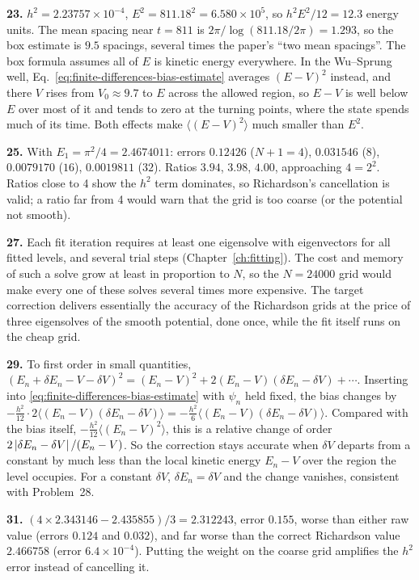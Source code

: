 \textbf{23.} $h^2=2.23757\times10^{-4}$, $E^2=811.18^2=6.580\times10^5$, so $h^2E^2/12=12.3$ energy units. The mean spacing near $t=811$ is $2\pi/\log(811.18/2\pi)=1.293$, so the box estimate is $9.5$ spacings, several times the paper's ``two mean spacings''. The box formula assumes all of $E$ is kinetic energy everywhere. In the Wu--Sprung well, Eq.~\eqref{eq:finite-differences-bias-estimate} averages $(E-V)^2$ instead, and there $V$ rises from $V_0\approx9.7$ to $E$ across the allowed region, so $E-V$ is well below $E$ over most of it and tends to zero at the turning points, where the state spends much of its time. Both effects make $\langle(E-V)^2\rangle$ much smaller than $E^2$.

\textbf{25.} With $E_1=\pi^2/4=2.4674011$: errors $0.12426$ ($N+1=4$), $0.031546$ ($8$), $0.0079170$ ($16$), $0.0019811$ ($32$). Ratios $3.94$, $3.98$, $4.00$, approaching $4=2^2$. Ratios close to 4 show the $h^2$ term dominates, so Richardson's cancellation is valid; a ratio far from 4 would warn that the grid is too coarse (or the potential not smooth).

\textbf{27.} Each fit iteration requires at least one eigensolve with eigenvectors for all fitted levels, and several trial steps (Chapter~\ref{ch:fitting}). The cost and memory of such a solve grow at least in proportion to $N$, so the $N=24000$ grid would make every one of these solves several times more expensive. The target correction delivers essentially the accuracy of the Richardson grids at the price of three eigensolves of the smooth potential, done once, while the fit itself runs on the cheap grid.

\textbf{29.} To first order in small quantities, $(E_n+\delta E_n-V-\delta V)^2=(E_n-V)^2+2(E_n-V)(\delta E_n-\delta V)+\cdots$. Inserting into \eqref{eq:finite-differences-bias-estimate} with $\psi_n$ held fixed, the bias changes by $-\tfrac{h^2}{12}\cdot2\langle(E_n-V)(\delta E_n-\delta V)\rangle=-\tfrac{h^2}{6}\langle(E_n-V)(\delta E_n-\delta V)\rangle$. Compared with the bias itself, $-\tfrac{h^2}{12}\langle(E_n-V)^2\rangle$, this is a relative change of order $2\left\lvert \delta E_n-\delta V\right\rvert/(E_n-V)$. So the correction stays accurate when $\delta V$ departs from a constant by much less than the local kinetic energy $E_n-V$ over the region the level occupies. For a constant $\delta V$, $\delta E_n=\delta V$ and the change vanishes, consistent with Problem~28.

\textbf{31.} $(4\times2.343146-2.435855)/3=2.312243$, error $0.155$, worse than either raw value (errors $0.124$ and $0.032$), and far worse than the correct Richardson value $2.466758$ (error $6.4\times10^{-4}$). Putting the weight on the coarse grid amplifies the $h^2$ error instead of cancelling it.
